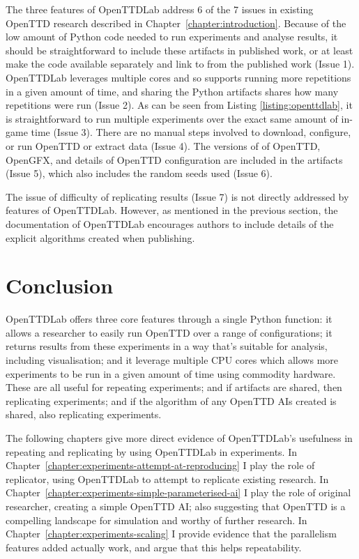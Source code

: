\documentclass[logo,msc,dsti]{style/infthesis}    %
\begin{document}
{The three features of OpenTTDLab address 6 of the 7 issues in existing OpenTTD research described in Chapter~\ref{chapter:introduction}. Because of the low amount of Python code needed to run experiments and analyse results, it should be straightforward to include these artifacts in published work, or at least make the code available separately and link to from the published work (Issue 1). OpenTTDLab leverages multiple cores and so supports running more repetitions in a given amount of time, and sharing the Python artifacts shares how many repetitions were run (Issue 2). As can be seen from Listing \ref{listing:openttdlab}, it is straightforward to run multiple experiments  over the exact same amount of in-game time (Issue 3). There are no manual steps involved to download, configure, or run OpenTTD or extract data (Issue 4). The versions of of OpenTTD, OpenGFX, and details of OpenTTD configuration are included in the artifacts (Issue 5), which also includes the random seeds used (Issue 6).

The issue of difficulty of replicating results (Issue 7) is not directly addressed by features of OpenTTDLab. However, as mentioned in the previous section, the documentation of OpenTTDLab encourages authors to include details of the explicit algorithms created when publishing.

\section{Conclusion}

OpenTTDLab offers three core features through a single Python function: it allows a researcher to easily run OpenTTD over a range of configurations; it returns results from these experiments in a way that's suitable for analysis, including visualisation; and it leverage multiple CPU cores which allows more experiments to be run in a given amount of time using commodity hardware. These are all useful for repeating experiments; and if artifacts are shared, then replicating experiments; and if the algorithm of any OpenTTD AIs created is shared, also replicating experiments.

The following chapters give more direct evidence of OpenTTDLab's usefulness in repeating and replicating by using OpenTTDLab in experiments. In Chapter~\ref{chapter:experiments-attempt-at-reproducing} I play the role of replicator, using OpenTTDLab to attempt to replicate existing research. In Chapter~\ref{chapter:experiments-simple-parameterised-ai} I play the role of original researcher, creating a simple OpenTTD AI; also suggesting that OpenTTD is a compelling landscape for simulation and worthy of further research. In Chapter~\ref{chapter:experiments-scaling} I provide evidence that the parallelism features added actually work, and argue that this helps repeatability.

}
\end{document}
